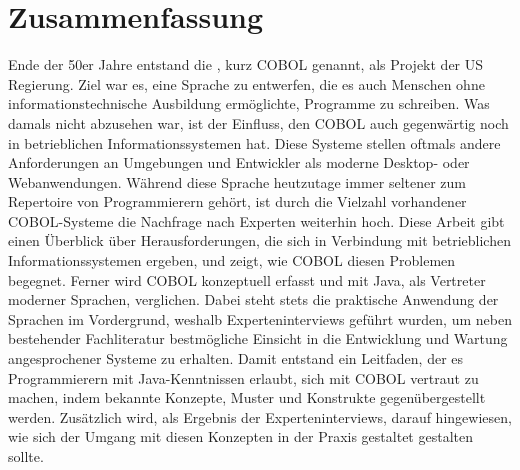 \chapter*{Zusammenfassung} 

Ende der 50er Jahre entstand die , kurz COBOL genannt, als Projekt der US Regierung. Ziel war es, eine Sprache zu entwerfen, die es auch Menschen ohne informationstechnische Ausbildung ermöglichte, Programme zu schreiben. Was damals nicht abzusehen war, ist der Einfluss, den COBOL auch gegenwärtig noch in betrieblichen Informationssystemen hat. Diese Systeme stellen oftmals andere Anforderungen an Umgebungen und Entwickler als moderne Desktop- oder Webanwendungen. Während diese Sprache heutzutage immer seltener zum Repertoire von Programmierern gehört, ist durch die Vielzahl vorhandener COBOL-Systeme die Nachfrage nach Experten weiterhin hoch. Diese Arbeit gibt einen Überblick über Herausforderungen, die sich in Verbindung mit betrieblichen Informationssystemen ergeben, und zeigt, wie COBOL diesen Problemen begegnet. Ferner wird COBOL konzeptuell erfasst und mit Java, als Vertreter moderner Sprachen, verglichen. Dabei steht stets die praktische Anwendung der Sprachen im Vordergrund, weshalb Experteninterviews geführt wurden, um neben bestehender Fachliteratur bestmögliche Einsicht in die Entwicklung und Wartung angesprochener Systeme zu erhalten. Damit entstand ein Leitfaden, der es Programmierern mit Java-Kenntnissen erlaubt, sich mit COBOL vertraut zu machen, indem bekannte Konzepte, Muster und Konstrukte gegenübergestellt werden. Zusätzlich wird, als Ergebnis der Experteninterviews, darauf hingewiesen, wie sich der Umgang mit diesen Konzepten in der Praxis gestaltet \bzw gestalten sollte. 